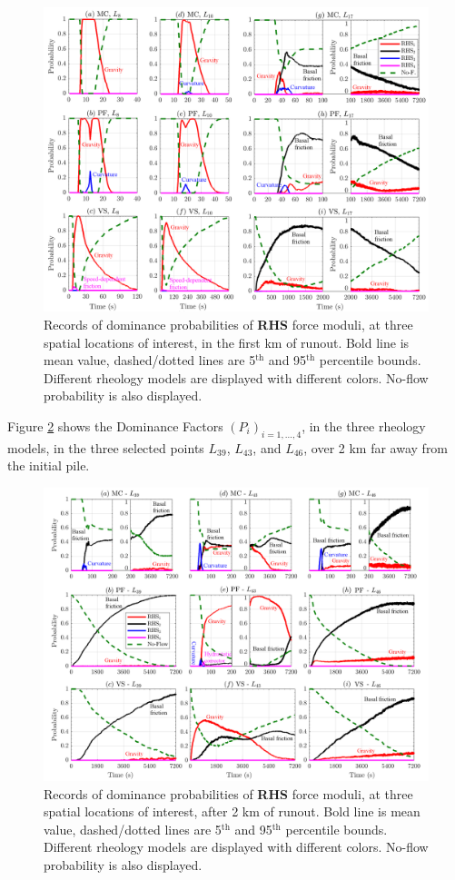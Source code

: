 \documentclass{article}
\begin{document}
\begin{figure}[H]
         \centering
        \includegraphics[width=1\textwidth]{BAF_VolcanDeColima/ForceContrib/Pr1_total.png}
        \caption{Records of dominance probabilities of \textbf{RHS} force moduli, at three spatial locations of interest, in the first km of runout. Bold line is mean value, dashed/dotted lines are 5$^{\mathrm{th}}$ and 95$^{\mathrm{th}}$ percentile bounds. Different rheology models are displayed with different colors. No-flow probability is also displayed.}
        \label{fig:Colima-Pr1}
\end{figure}
\newpage
Figure \ref{fig:Colima-Pr2} shows the Dominance Factors $(P_i)_{i=1,\dots,4}$, in the three rheology models, in the three selected points $L_{39}$, $L_{43}$, and $L_{46}$, over 2 km far away from the initial pile.
\begin{figure}[H]
         \centering
        \includegraphics[width=1\textwidth]{BAF_VolcanDeColima/ForceContrib/Pr2_total.png}
        \caption{Records of dominance probabilities of \textbf{RHS} force moduli, at three spatial locations of interest, after 2 km of runout. Bold line is mean value, dashed/dotted lines are 5$^{\mathrm{th}}$ and 95$^{\mathrm{th}}$ percentile bounds. Different rheology models are displayed with different colors. No-flow probability is also displayed.}
        \label{fig:Colima-Pr2}
\end{figure}
\end{document}
